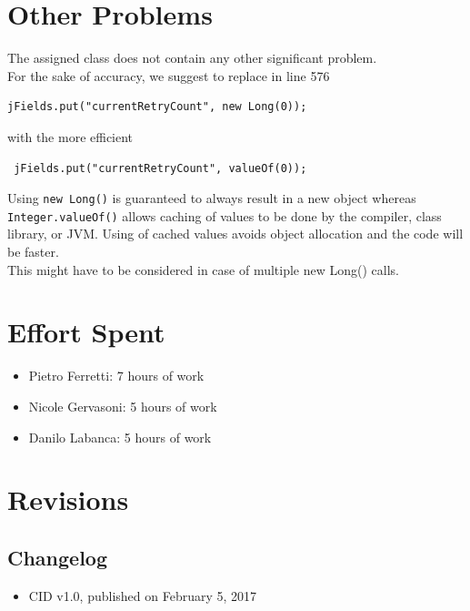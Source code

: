 \documentclass[english]{article}
\begin{document}
\newpage
\section{Other Problems} %
The assigned class does not contain any other significant problem.\\
For the sake of accuracy, we suggest to replace in line 576
\begin{lstlisting}
jFields.put("currentRetryCount", new Long(0));\end{lstlisting}
with the more efficient
\begin{lstlisting}
 jFields.put("currentRetryCount", valueOf(0));
\end{lstlisting}
Using \lstinline|new Long()| is guaranteed to always result in a new object whereas \lstinline|Integer.valueOf()| allows caching of values to be done by the compiler, class library, or JVM. Using of cached values avoids object allocation and the code will be faster.\\
This might have to be considered in case of multiple new Long() calls.

\section{Effort Spent}
\begin{itemize}
	\item{Pietro Ferretti: 7 hours of work}
	\item{Nicole Gervasoni: 5 hours of work}
	\item{Danilo Labanca: 5 hours of work}
\end{itemize}


\section{Revisions}

\subsection{Changelog}
\begin{itemize}
	\item{CID v1.0, published on February 5, 2017}
\end{itemize}
\end{document}
